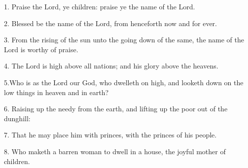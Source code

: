 1. Praise the Lord, ye children: praise ye the name of the Lord.
 	
2. Blessed be the name of the Lord, from henceforth now and for ever.
 	
3. From the rising of the sun unto the going down of the same, the name of the Lord is worthy of praise.
 	
4. The Lord is high above all nations; and his glory above the heavens.
 	
5.Who is as the Lord our God, who dwelleth on high, and looketh down on the low things in heaven and in earth?
 	
6. Raising up the needy from the earth, and lifting up the poor out of the dunghill:
 	
7. That he may place him with princes, with the princes of his people.
 	
8. Who maketh a barren woman to dwell in a house, the joyful mother of children. 